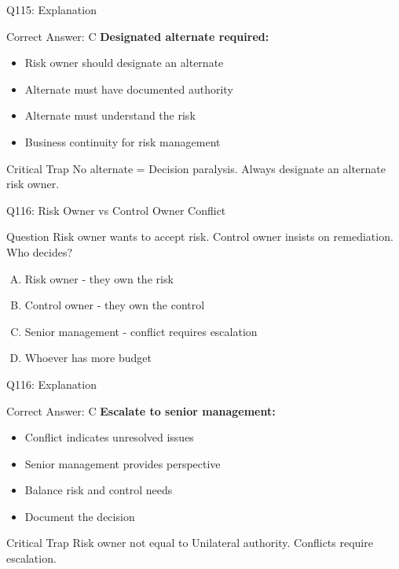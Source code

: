 \documentclass{beamer}
\begin{document}
	\begin{frame}{Q115: Explanation}
		\begin{block}{Correct Answer: C}
			\textbf{Designated alternate required:}
			\begin{itemize}
				\item Risk owner should designate an alternate
				\item Alternate must have documented authority
				\item Alternate must understand the risk
				\item Business continuity for risk management
			\end{itemize}
		\end{block}
		\begin{alertblock}{Critical Trap}
			No alternate = Decision paralysis.
			Always designate an alternate risk owner.
		\end{alertblock}
	\end{frame}
	
	\begin{frame}{Q116: Risk Owner vs Control Owner Conflict}
		\begin{block}{Question}
			Risk owner wants to accept risk. Control owner insists on remediation. Who decides?
		\end{block}
		\begin{enumerate}[(A)]
			\item Risk owner - they own the risk
			\item Control owner - they own the control
			\item Senior management - conflict requires escalation
			\item Whoever has more budget
		\end{enumerate}
	\end{frame}
	
	\begin{frame}{Q116: Explanation}
		\begin{block}{Correct Answer: C}
			\textbf{Escalate to senior management:}
			\begin{itemize}
				\item Conflict indicates unresolved issues
				\item Senior management provides perspective
				\item Balance risk and control needs
				\item Document the decision
			\end{itemize}
		\end{block}
		\begin{alertblock}{Critical Trap}
			Risk owner not equal to Unilateral authority.
			Conflicts require escalation.
		\end{alertblock}
	\end{frame}
	
\end{document}
